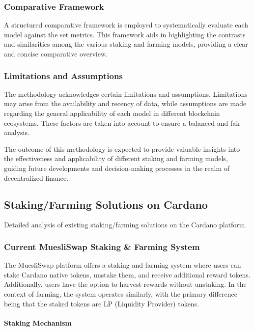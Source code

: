 \documentclass[12pt,parskip=full, tikz]{article}
\begin{document}
\subsubsection{Comparative Framework}
A structured comparative framework is employed to systematically evaluate each model against the set metrics. This framework aids in highlighting the contrasts and similarities among the various staking and farming models, providing a clear and concise comparative overview.

\subsubsection{Limitations and Assumptions}
The methodology acknowledges certain limitations and assumptions. Limitations may arise from the availability and recency of data, while assumptions are made regarding the general applicability of each model in different blockchain ecosystems. These factors are taken into account to ensure a balanced and fair analysis.

The outcome of this methodology is expected to provide valuable insights into the effectiveness and applicability of different staking and farming models, guiding future developments and decision-making processes in the realm of decentralized finance.


\subsection{Staking/Farming Solutions on Cardano}
Detailed analysis of existing staking/farming solutions on the Cardano platform.

\subsubsection{Current MuesliSwap Staking \& Farming System}

The MuesliSwap platform offers a staking and farming system where users can stake Cardano native tokens, unstake them, and receive additional reward tokens. Additionally, users have the option to harvest rewards without unstaking. In the context of farming, the system operates similarly, with the primary difference being that the staked tokens are LP (Liquidity Provider) tokens.

\paragraph{Staking Mechanism}
\end{document}
